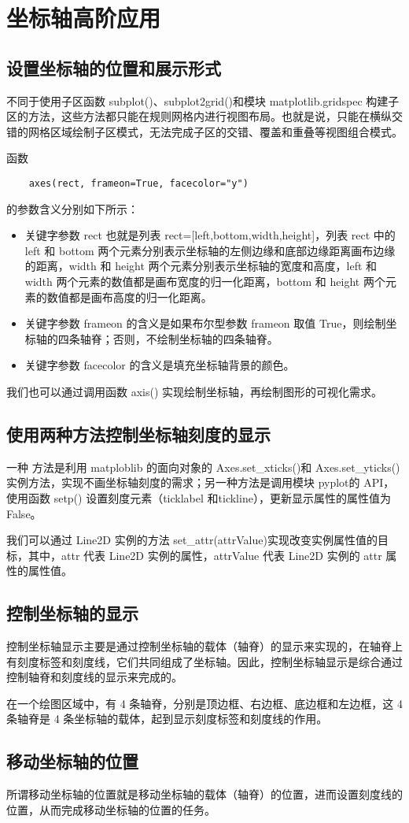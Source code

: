 \chapter{坐标轴高阶应用\label{ch08}}
\section{设置坐标轴的位置和展示形式}
不同于使用子区函数 subplot()、subplot2grid()和模块 matplotlib.gridspec 构建子区的方法，这些方法都只能在规则网格内进行视图布局。也就是说，只能在横纵交错的网格区域绘制子区模式，无法完成子区的交错、覆盖和重叠等视图组合模式。

函数
\begin{verbatim}
    axes(rect, frameon=True, facecolor="y")
\end{verbatim}
的参数含义分别如下所示：
\begin{itemize}
    \item 关键字参数 rect 也就是列表 rect=[left,bottom,width,height]，列表 rect 中的 left 和 bottom 两个元素分别表示坐标轴的左侧边缘和底部边缘距离画布边缘的距离，width 和 height 两个元素分别表示坐标轴的宽度和高度，left 和 width 两个元素的数值都是画布宽度的归一化距离，bottom 和 height 两个元素的数值都是画布高度的归一化距离。
    \item 关键字参数 frameon 的含义是如果布尔型参数 frameon 取值 True，则绘制坐标轴的四条轴脊；否则，不绘制坐标轴的四条轴脊。
    \item 关键字参数 facecolor 的含义是填充坐标轴背景的颜色。
\end{itemize}

我们也可以通过调用函数 axis() 实现绘制坐标轴，再绘制图形的可视化需求。
\section{使用两种方法控制坐标轴刻度的显示}
一种
方法是利用 matploblib 的面向对象的 Axes.set\_xticks()和 Axes.set\_yticks() 实例方法，实现不画坐标轴刻度的需求；另一种方法是调用模块 pyplot的 API，使用函数 setp() 设置刻度元素（ticklabel 和tickline），更新显示属性的属性值为 False。

我们可以通过 Line2D 实例的方法 set\_attr(attrValue)实现改变实例属性值的目标，其中，attr 代表 Line2D 实例的属性，attrValue 代表 Line2D 实例的 attr 属性的属性值。
\section{控制坐标轴的显示}
控制坐标轴显示主要是通过控制坐标轴的载体（轴脊）的显示来实现的，在轴脊上有刻度标签和刻度线，它们共同组成了坐标轴。因此，控制坐标轴显示是综合通过控制轴脊和刻度线的显示来完成的。

在一个绘图区域中，有 4 条轴脊，分别是顶边框、右边框、底边框和左边框，这 4 条轴脊是 4 条坐标轴的载体，起到显示刻度标签和刻度线的作用。
\section{移动坐标轴的位置}
所谓移动坐标轴的位置就是移动坐标轴的载体（轴脊）的位置，进而设置刻度线的位置，从而完成移动坐标轴的位置的任务。
